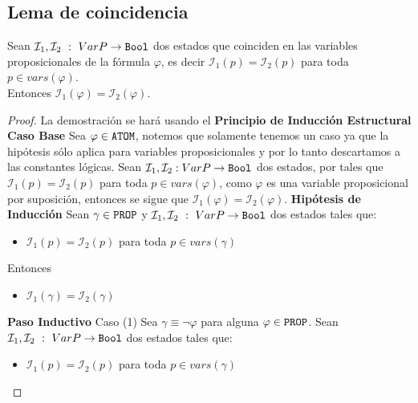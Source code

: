 \documentclass[a4paper]{article}
\begin{document}
\subsection{Lema de coincidencia}
\noindent
Sean $\mathcal{I}_1,\mathcal{I}_2 \ : \ VarP \to \text{\texttt{Bool}}$ dos estados que coinciden en las variables 
proposicionales de la fórmula $\varphi$, es decir 
$\mathcal{I}_{1}(p)=\mathcal{I}_2(p)$ para toda $p\in vars(\varphi)$.\\
Entonces $\mathcal{I}_1(\varphi)=\mathcal{I}_2(\varphi)$.
\begin{proof}
    La demostración se hará usando el \textbf{Principio de Inducción Estructural}
    \newline
    \textbf{Caso Base}
    \newline
    Sea \(\varphi \in \text{\texttt{ATOM}}\), notemos que solamente tenemos un caso ya que la hipótesis sólo 
    aplica para variables proposicionales y por lo tanto descartamos a las constantes lógicas. 
    Sean \(\mathcal{I}_{1}, \mathcal{I}_{2}: VarP \to \text{\texttt{Bool}}\) dos estados, por tales que
    $\mathcal{I}_{1}(p)=\mathcal{I}_2(p)$ para toda $p\in vars(\varphi)$, como \(\varphi\) es una variable
    proposicional por suposición, entonces se sigue que $\mathcal{I}_1(\varphi)=\mathcal{I}_2(\varphi)$.
    \newline
    \textbf{Hipótesis de Inducción}
    \newline
    Sean \(\gamma \in \text{\texttt{PROP}}\) y $\mathcal{I}_1,\mathcal{I}_2 \ : \ VarP \to \text{\texttt{Bool}}$
    dos estados tales que:
    \begin{itemize}
        \item $\mathcal{I}_{1}(p)=\mathcal{I}_2(p)$ para toda $p\in vars(\gamma)$
    \end{itemize}
    Entonces 
    \begin{itemize}
        \item $\mathcal{I}_1(\gamma)=\mathcal{I}_2(\gamma)$
    \end{itemize}
    \textbf{Paso Inductivo}
    \newline
    Caso (1)
    \newline
    Sea \(\gamma \equiv \neg \varphi\) para alguna \(\varphi \in \text{\texttt{PROP}}\). Sean $\mathcal{I}_1,\mathcal{I}_2 \ : \ VarP \to \text{\texttt{Bool}}$
    dos estados tales que:
    \begin{itemize}
        \item $\mathcal{I}_{1}(p)=\mathcal{I}_2(p)$ para toda $p\in vars(\gamma)$
    \end{itemize}

\end{proof}
\end{document}
